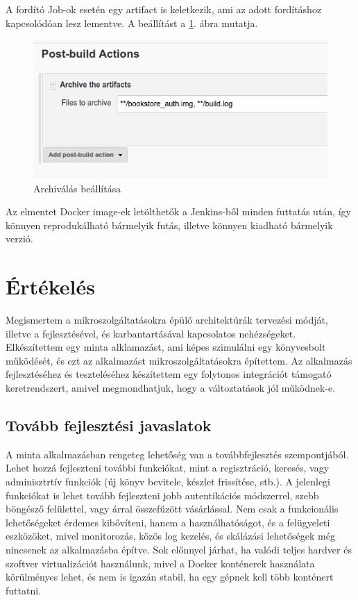 \documentclass[11pt,magyar,a4paper,twoside,]{report}
\let\Oldincludegraphics\includegraphics
\renewcommand{\includegraphics}[1]{
\begin{adjustbox}{max size={\textwidth}{\textheight}}
    \Oldincludegraphics[scale=0.6]{#1}%
\end{adjustbox}
}
\begin{document}
A fordító Job-ok esetén egy artifact is keletkezik, ami az adott
fordításhoz kapcsolódóan lesz lementve. A beállítást a \ref{archive}.
ábra mutatja.

\begin{figure}[H]
\centering
\includegraphics{img/archive.png}
\caption{Archiválás beállítása\label{archive}}
\end{figure}

Az elmentet Docker image-ek letölthetők a Jenkins-ből minden futtatás
után, így könnyen reprodukálható bármelyik futás, illetve könnyen
kiadható bármelyik verzió.

\chapter{Értékelés}\label{uxe9rtuxe9keluxe9s}

Megismertem a mikroszolgáltatásokra épülő architektúrák tervezési
módját, illetve a fejlesztésével, és karbantartásával kapcsolatos
nehézségeket. Elkészítettem egy minta alklamazást, ami képes szimulálni
egy könyvesbolt működését, és ezt az alkalmazást mikroszolgáltatásokra
építettem. Az alkalmazás fejlesztéséhez és teszteléséhez készítettem egy
folytonos integrációt támogató keretrendszert, amivel megmondhatjuk,
hogy a változtatások jól működnek-e.

\section{Tovább fejlesztési
javaslatok}\label{tovuxe1bb-fejlesztuxe9si-javaslatok}

A minta alkalmazásban rengeteg lehetőség van a továbbfejlesztés
szempontjából. Lehet hozzá fejleszteni további funkciókat, mint a
regisztráció, keresés, vagy adminisztrtív funkciók (új könyv bevitele,
készlet frissítése, stb.). A jelenlegi funkciókat is lehet tovább
fejleszteni jobb autentikációs módszerrel, szebb böngésző felülettel,
vagy árral összefűzött vásárlással. Nem csak a funkcionális
lehetőségeket érdemes kibővíteni, hanem a használhatóságot, és a
felügyeleti eszközöket, mivel monitorozás, közös log kezelés, és
skálázási lehetőségek még nincsenek az alkalmazásba építve. Sok előnnyel
járhat, ha valódi teljes hardver és szoftver virtualizációt használunk,
mivel a Docker konténerek használata körülményes lehet, és nem is igazán
stabil, ha egy gépnek kell több konténert futtatni.
\end{document}
